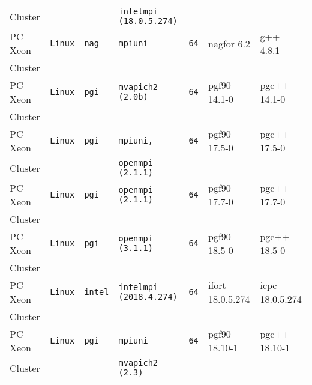 \begin{longtable}{lllllll}
Cluster        &           &                 &\tt intelmpi \footnotesize (18.0.5.274) &                 &                  &                                   \\
PC Xeon        &\tt Linux  &\tt nag          &\tt mpiuni           &\tt 64           & nagfor \footnotesize 6.2            & g++  \footnotesize 4.8.1          \\
Cluster        &           &                 &                     &                 &                                     &                                   \\
PC Xeon        &\tt Linux  &\tt pgi          &\tt mvapich2 \footnotesize (2.0b)  &\tt 64 & pgf90 \footnotesize 14.1-0      & pgc++ \footnotesize 14.1-0        \\
Cluster        &           &                 &                     &                 &                                     &                                   \\
PC Xeon        &\tt Linux  &\tt pgi          &\tt mpiuni,          &\tt 64           & pgf90 \footnotesize 17.5-0          & pgc++ \footnotesize 17.5-0        \\
Cluster        &           &                 &\tt openmpi \footnotesize (2.1.1)&     &                                     &                                   \\
PC Xeon        &\tt Linux  &\tt pgi          &\tt openmpi \footnotesize (2.1.1)&\tt 64& pgf90 \footnotesize 17.7-0         & pgc++ \footnotesize 17.7-0        \\
Cluster        &           &                 &                     &                 &                                     &                                   \\
PC Xeon        &\tt Linux  &\tt pgi          &\tt openmpi \footnotesize (3.1.1)&\tt 64& pgf90 \footnotesize 18.5-0         & pgc++ \footnotesize 18.5-0        \\
Cluster        &           &                 &                     &                 &                                     &                                   \\
PC Xeon        &\tt Linux  &\tt intel        &\tt intelmpi \footnotesize (2018.4.274)&\tt 64& ifort \footnotesize 18.0.5.274 & icpc \footnotesize 18.0.5.274   \\
Cluster        &           &                 &                     &                 &                                     &                                   \\
PC Xeon        &\tt Linux  &\tt pgi          &\tt mpiuni           &\tt 64           & pgf90 \footnotesize 18.10-1         & pgc++ \footnotesize 18.10-1       \\
Cluster        &           &                 &\tt mvapich2 \footnotesize (2.3) &     &                                     &                                   
\end{longtable}

